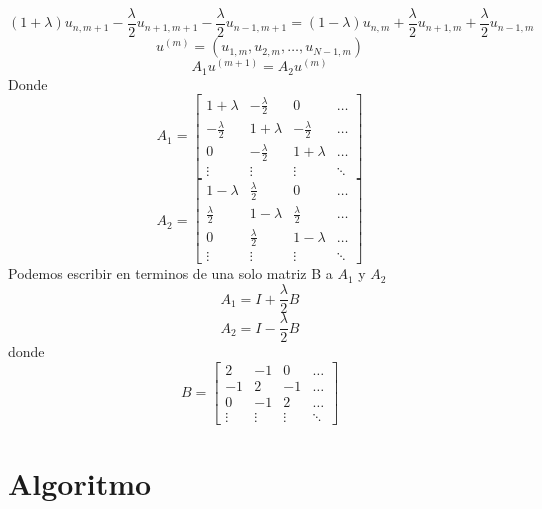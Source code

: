 \documentclass[11pt]{article} %
\begin{document}
$$(1+\lambda)u_{n,m+1}-\frac{\lambda}{2}u_{n+1,m+1}-\frac{\lambda}{2}u_{n-1,m+1}=(1-\lambda)u_{n,m}+\frac{\lambda}{2}u_{n+1,m}+\frac{\lambda}{2}u_{n-1,m}$$
$$u^{(m)}=(u_{1,m},u_{2,m},\ldots,u_{N-1,m})$$
$$A_1u^{(m+1)}=A_2u^{(m)}$$
Donde
$$
A_1=
\begin{bmatrix}
  1+\lambda  & -\frac{\lambda}{2} & 0 & \ldots\\ 
 -\frac{\lambda}{2} & 1+\lambda & -\frac{\lambda}{2} & \ldots\\ 
 0 & -\frac{\lambda}{2} & 1+\lambda & \ldots\\ 
 \vdots & \vdots & \vdots & \ddots 
\end{bmatrix}
$$
$$
A_2=
\begin{bmatrix}
 1-\lambda  & \frac{\lambda}{2} & 0 & \ldots\\ 
 \frac{\lambda}{2} & 1-\lambda & \frac{\lambda}{2} & \ldots\\ 
 0 & \frac{\lambda}{2} & 1-\lambda & \ldots\\ 
 \vdots & \vdots & \vdots & \ddots 
\end{bmatrix}
$$
Podemos escribir en terminos de una solo matriz B a $A_1$ y $A_2$
$$
A_1=I+\frac{\lambda}{2}B
$$
$$
A_2=I-\frac{\lambda}{2}B
$$
donde
$$
B=
\begin{bmatrix}
 2  & -1 & 0 & \ldots\\ 
 -1 & 2 & -1 & \ldots\\ 
 0 & -1 & 2 & \ldots\\ 
 \vdots & \vdots & \vdots & \ddots 
\end{bmatrix}
$$



\section*{Algoritmo}
\end{document}

